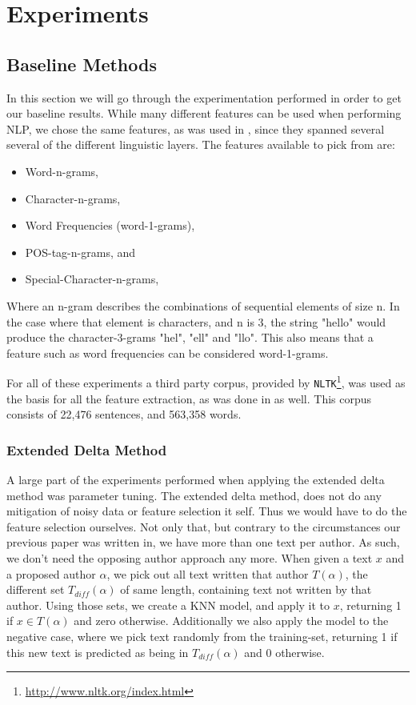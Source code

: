 \section{Experiments} \label{sec:experiments}


\subsection{Baseline Methods}

In this section we will go through the experimentation performed in order
to get our baseline results. While many different features can be used when
performing \gls{NLP}, we chose the same features, as was used in \cite{US},
since they spanned several several of the different linguistic layers. The
features available to pick from are:

\begin{itemize}
    \item Word-n-grams,
    \item Character-n-grams,
    \item Word Frequencies (word-1-grams),
    \item \gls{POS}-tag-n-grams, and
    \item Special-Character-n-grams,
\end{itemize}

Where an n-gram describes the combinations of sequential elements of size n. In
the case where that element is characters, and n is 3, the string "hello" would
produce the character-3-grams "hel", "ell" and "llo". This also means that a
feature such as word frequencies can be considered word-1-grams.

For all of these experiments a third party corpus, provided by
\texttt{NLTK}\footnote{\url{http://www.nltk.org/index.html}}, was used as the
basis for all the feature extraction, as was done in \cite{US} as well. This
corpus consists of 22,476 sentences, and 563,358 words.


\subsubsection{Extended Delta Method}


A large part of the experiments performed when applying the extended delta
method was parameter tuning. The extended delta method, does not do any
mitigation of noisy data or feature selection it self. Thus we would have
to do the feature selection ourselves. Not only that, but contrary to the
circumstances our previous paper \cite{US} was written in, we have more than
one text per author. As such, we don't need the opposing author approach any
more. When given a text $x$ and a proposed author $\alpha$, we pick out all text
written that author $T(\alpha)$, the different set $T_{diff}(\alpha)$ of same
length, containing text not written by that author. Using those sets, we create
a \gls{KNN} model, and apply it to $x$, returning 1 if $x \in T(\alpha)$ and
zero otherwise.
Additionally we also apply the model to the negative case, where we pick
text randomly from the training-set, returning 1 if this new text is predicted
as being in $T_{diff}(\alpha)$ and 0 otherwise.

